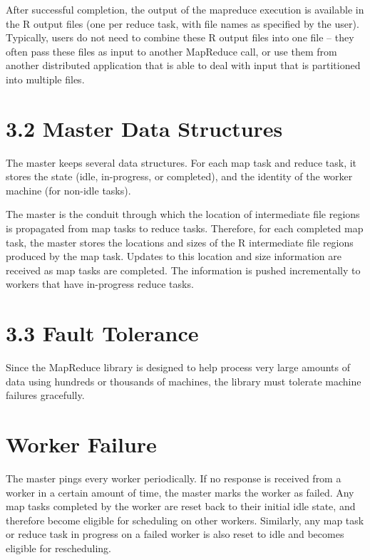 \documentclass[
]{article}
\begin{document}
After successful completion, the output of the mapreduce execution is
available in the R output files (one per reduce task, with file names as
specified by the user). Typically, users do not need to combine these R
output files into one file -- they often pass these files as input to
another MapReduce call, or use them from another distributed application
that is able to deal with input that is partitioned into multiple files.

\section{3.2 Master Data Structures}\label{master-data-structures}

The master keeps several data structures. For each map task and reduce
task, it stores the state (idle, in-progress, or completed), and the
identity of the worker machine (for non-idle tasks).

The master is the conduit through which the location of intermediate
file regions is propagated from map tasks to reduce tasks. Therefore,
for each completed map task, the master stores the locations and sizes
of the R intermediate file regions produced by the map task. Updates to
this location and size information are received as map tasks are
completed. The information is pushed incrementally to workers that have
in-progress reduce tasks.

\section{3.3 Fault Tolerance}\label{fault-tolerance}

Since the MapReduce library is designed to help process very large
amounts of data using hundreds or thousands of machines, the library
must tolerate machine failures gracefully.

\section{Worker Failure}\label{worker-failure}

The master pings every worker periodically. If no response is received
from a worker in a certain amount of time, the master marks the worker
as failed. Any map tasks completed by the worker are reset back to their
initial idle state, and therefore become eligible for scheduling on
other workers. Similarly, any map task or reduce task in progress on a
failed worker is also reset to idle and becomes eligible for
rescheduling.
\end{document}
